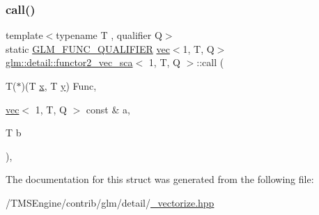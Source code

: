 \subsubsection{\texorpdfstring{call()}{call()}}
{\footnotesize\ttfamily template$<$typename T , qualifier Q$>$ \\
static \hyperlink{setup_8hpp_a33fdea6f91c5f834105f7415e2a64407}{G\+L\+M\+\_\+\+F\+U\+N\+C\+\_\+\+Q\+U\+A\+L\+I\+F\+I\+ER} \hyperlink{structglm_1_1vec}{vec}$<$1, T, Q$>$ \hyperlink{structglm_1_1detail_1_1functor2__vec__sca}{glm\+::detail\+::functor2\+\_\+vec\+\_\+sca}$<$ 1, T, Q $>$\+::call (\begin{DoxyParamCaption}\item[{T($\ast$)(T \hyperlink{_s_d_l__opengl_8h_ad0e63d0edcdbd3d79554076bf309fd47}{x}, T \hyperlink{_s_d_l__opengl_8h_a1675d9d7bb68e1657ff028643b4037e3}{y})}]{Func,  }\item[{\hyperlink{structglm_1_1vec}{vec}$<$ 1, T, Q $>$ const \&}]{a,  }\item[{T}]{b }\end{DoxyParamCaption})\hspace{0.3cm}{\ttfamily [inline]}, {\ttfamily [static]}}



The documentation for this struct was generated from the following file\+:\begin{DoxyCompactItemize}
\item 
/\+T\+M\+S\+Engine/contrib/glm/detail/\hyperlink{__vectorize_8hpp}{\+\_\+vectorize.\+hpp}\end{DoxyCompactItemize}
